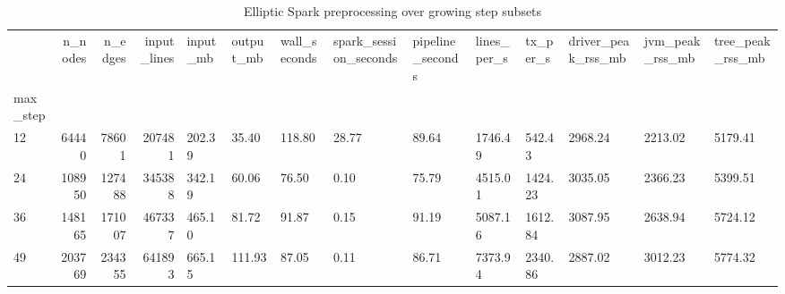 \begin{table}
\caption{Elliptic Spark preprocessing over growing step subsets}
\label{tab:01_spark_scaling}
\begin{tabular}{lrrrllllllllll}
\toprule
 & n\_nodes & n\_edges & input\_lines & input\_mb & output\_mb & wall\_seconds & spark\_session\_seconds & pipeline\_seconds & lines\_per\_s & tx\_per\_s & driver\_peak\_rss\_mb & jvm\_peak\_rss\_mb & tree\_peak\_rss\_mb \\
max\_step &  &  &  &  &  &  &  &  &  &  &  &  &  \\
\midrule
12 & 64440 & 78601 & 207481 & 202.39 & 35.40 & 118.80 & 28.77 & 89.64 & 1746.49 & 542.43 & 2968.24 & 2213.02 & 5179.41 \\
24 & 108950 & 127488 & 345388 & 342.19 & 60.06 & 76.50 & 0.10 & 75.79 & 4515.01 & 1424.23 & 3035.05 & 2366.23 & 5399.51 \\
36 & 148165 & 171007 & 467337 & 465.10 & 81.72 & 91.87 & 0.15 & 91.19 & 5087.16 & 1612.84 & 3087.95 & 2638.94 & 5724.12 \\
49 & 203769 & 234355 & 641893 & 665.15 & 111.93 & 87.05 & 0.11 & 86.71 & 7373.94 & 2340.86 & 2887.02 & 3012.23 & 5774.32 \\
\bottomrule
\end{tabular}
\end{table}
